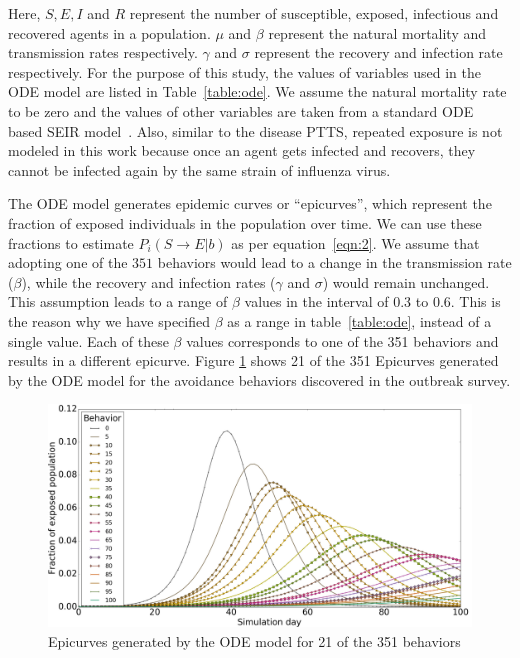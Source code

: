 \documentclass[doublespace,draft]{VTthesis}
\begin{document}
    Here, $S,E,I$ and $R$ represent the number of susceptible, exposed, infectious and recovered agents in a population. $\mu$ and $\beta$ represent the natural mortality and transmission rates respectively. $\gamma$ and $\sigma$ represent the recovery and infection rate respectively. For the purpose of this study, the values of variables used in the ODE model are listed in Table~\ref{table:ode}. We assume the natural mortality rate to be zero and the values of other variables are taken from a standard ODE based SEIR model~\cite{keeling2008modeling}. Also, similar to the disease PTTS, repeated exposure is not modeled in this work because once an agent gets infected and recovers, they cannot be infected again by the same strain of influenza virus. 
    
    The ODE model generates epidemic curves or ``epicurves'', which represent the fraction of exposed individuals in the population over time. We can use these fractions to estimate $P_i(S \rightarrow E|b)$ as per equation~\ref{eqn:2}. We assume that adopting one of the $351$ behaviors would lead to a change in the transmission rate ($\beta$), while the recovery and infection rates ($\gamma$ and $\sigma$) would remain unchanged. This assumption leads to a range of $\beta$ values in the interval of 0.3 to 0.6. This is the reason why we have specified $\beta$ as a range in table~\ref{table:ode}, instead of a single value. Each of these $\beta$ values corresponds to one of the 351 behaviors and results in a different epicurve. Figure \ref{fig:epicurves} shows 21 of the 351 Epicurves generated by the ODE model for the avoidance behaviors discovered in the outbreak survey.
    \begin{figure}
    \centering
    \includegraphics[width=\textwidth]{figures/epicurves.png}
    \caption{Epicurves generated by the ODE model for 21 of the 351 behaviors}
    \label{fig:epicurves}
    \end{figure}
    
\end{document}
